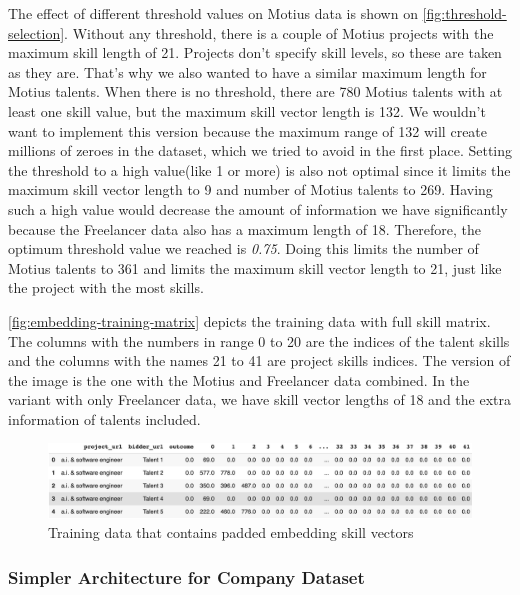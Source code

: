 The effect of different threshold values on Motius data is shown on \autoref{fig:threshold-selection}. Without any threshold, there is a couple of Motius projects with the maximum skill length of 21. Projects don't specify skill levels, so these are taken as they are. That's why we also wanted to have a similar maximum length for Motius talents. When there is no threshold, there are 780 Motius talents with at least one skill value, but the maximum skill vector length is 132. We wouldn't want to implement this version because the maximum range of 132 will create millions of zeroes in the dataset, which we tried to avoid in the first place. Setting the threshold to a high value(like 1 or more) is also not optimal since it limits the maximum skill vector length to 9 and number of Motius talents to 269. Having such a high value would decrease the amount of information we have significantly because the Freelancer data also has a maximum length of 18. Therefore, the optimum threshold value we reached is \textit{0.75}. Doing this limits the number of Motius talents to 361 and limits the maximum skill vector length to 21, just like the project with the most skills.

\autoref{fig:embedding-training-matrix} depicts the training data with full skill matrix. The columns with the numbers in range 0 to 20 are the indices of the talent skills and the columns with the names 21 to 41 are project skills indices.  The version of the image is the one with the Motius and Freelancer data combined. In the variant with only Freelancer data, we have skill vector lengths of 18 and the extra information of talents included.

 \begin{figure}[htp]
	\centering
	\includegraphics[width=\textwidth]{figures/EmbeddingTrainingMatrix.png}
	\caption{Training data that contains padded embedding skill vectors}
	\label{fig:embedding-training-matrix}
\end{figure}



\subsubsection{Simpler Architecture for Company Dataset}

